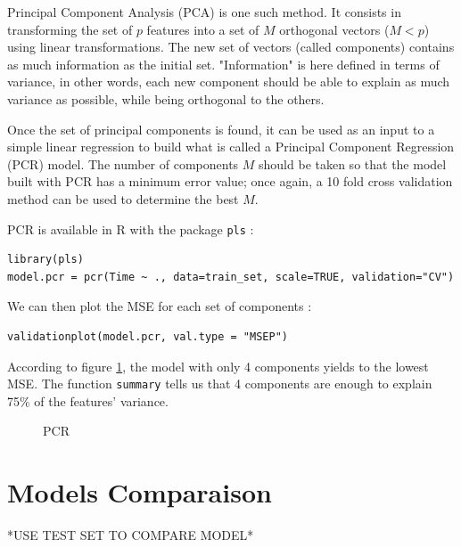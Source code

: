 \documentclass[]{report}
\newcommand{\inputtikz}[2]{%
	\scalebox{#1}{}  
}
\begin{document}
Principal Component Analysis (PCA) is one such method. It consists in transforming the set of $p$ features into a set of $M$ orthogonal vectors ($M < p$) using linear transformations. The new set of vectors (called components) contains as much information as the initial set. "Information" is here defined in terms of variance, in other words, each new component should be able to explain as much variance as possible, while being orthogonal to the others.

Once the set of principal components is found, it can be used as an input to a simple linear regression to build what is called a Principal Component Regression (PCR) model. The number of components $M$ should be taken so that the model built with PCR has a minimum error value; once again, a 10 fold cross validation method can be used to determine the best $M$.

PCR is available in R with the package \texttt{pls} :
\begin{lstlisting}
library(pls)
model.pcr = pcr(Time ~ ., data=train_set, scale=TRUE, validation="CV")
\end{lstlisting}

We can then plot the MSE for each set of components :
\begin{lstlisting}
validationplot(model.pcr, val.type = "MSEP")
\end{lstlisting}

According to figure \ref{fig:pcr_cv}, the model with only 4 components yields to the lowest MSE. The function \texttt{summary} tells us that 4 components are enough to explain 75\% of the features' variance. 

\begin{figure}[!h]
	\centering
	\inputtikz{0.5}{Figures/pcr_cv.tex}
	\caption{PCR}
	\label{fig:pcr_cv}
\end{figure}



\section{Models Comparaison}

*USE TEST SET TO COMPARE MODEL*
\end{document}
